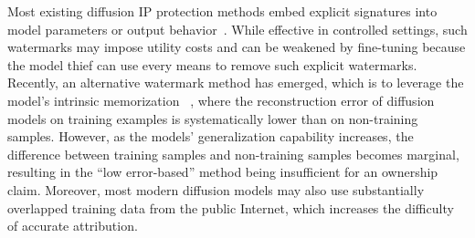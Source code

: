 \documentclass[sigconf, review, anonymous]{acmart}
\begin{document}
Most existing diffusion IP protection methods embed explicit signatures into model parameters or output behavior~\citep{peng2023watermark,zhao2023recipe,fernandez2023stable,liu2023watermarking}.
While effective in controlled settings, such watermarks may impose utility costs and can be weakened by fine-tuning because the model thief can use every means to remove such explicit watermarks.
Recently, an alternative watermark method has emerged, which is to leverage the model's intrinsic memorization~\citep{carlini2023extracting,somepalli2023diffusion,gu2025on} , where the reconstruction error of diffusion models on training examples is systematically lower than on non-training samples.
However, as the models' generalization capability increases, the difference between training samples and non-training samples becomes marginal, resulting in the ``low error-based'' method being insufficient for an ownership claim.
Moreover, most modern diffusion models may also use substantially overlapped training data from the public Internet, which increases the difficulty of accurate attribution.
\end{document}
